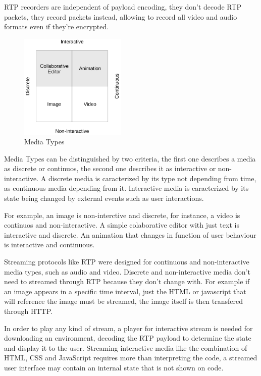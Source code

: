   \ac{RTP} recorders are independent of payload encoding, they don't decode \ac{RTP} packets, they record packets instead, allowing to record all video and audio formats even if they're encrypted.

\begin{figure}[H]
	\begin{center}
		\centering
		\includegraphics[width=0.45\textwidth]{figures/media_types.png}

	\caption{Media Types}
	\end{center}
\end{figure}

	Media Types can be distinguished by two criteria, the first one describes a media as discrete or continuos, the second one describes it as interactive or non-interactive. A discrete media is caracterized by its type not depending from time, as continuous media depending from it. Interactive media is caracterized by its state being changed by external events such as user interactions.

	For example, an image is non-interctive and discrete, for instance, a video is continuos and non-interactive. A simple colaborative editor with just text is interactive and discrete. An animation that changes in function of user behaviour is interactive and continuous.

	Streaming protocols like \ac {RTP} were designed for continuous and non-interactive media types, such as audio and video. Discrete and non-interactive media don't need to streamed through \ac{RTP} because they don't change with. For example if an image appears in a specific time interval, just the \ac{HTML} or javascript that will reference the image must be streamed, the image itself is then transfered through \ac{HTTP}.

	In order to play any kind of stream, a player for interactive stream is needed for downloading an environment, decoding the \ac{RTP} payload to determine the state and display it to the user. Streaming interactive media like the combination of \ac{HTML}, \ac{CSS} and JavaScript requires more than interpreting the code, a streamed user interface may contain an internal state that is not shown on code.


